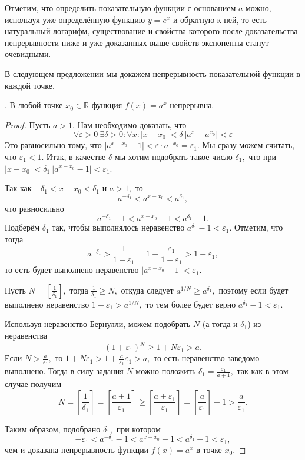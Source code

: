Отметим, что определить показательную
функции с основанием $a$ можно,
используя уже определённую функцию $y=e^x$
и обратную к ней, то есть натуральный
логарифм, существование и свойства
которого после доказательства непрерывности
ниже и уже доказанных выше свойств экспоненты
станут очевидными.

В следующем предложении мы докажем непрерывность
показательной функции в каждой точке.
\begin{proposition}.
    В любой точке
    $x_0 \in \mathbb R$ функция $f(x)=a^x$ непрерывна.
\end{proposition}
\begin{proof}
    Пусть $a > 1$. Нам необходимо доказать, что
    $$
        \forall \varepsilon>0 \ \exists \delta>0:
        \forall x: |x-x_0|<\delta \ |a ^x - a^{x_0}| <
        \varepsilon
    $$
    Это равносильно тому, что $|a^{x - x_0} - 1|
        < \varepsilon \cdot a^{-x_0} = \varepsilon_1$.
    Мы сразу можем считать, что $\varepsilon_1 < 1$.
    Итак, в качестве $\delta$ мы хотим подобрать
    такое число $\delta_1,$ что
    при $|x - x_0|< \delta_1 \ |a^{x - x_0}-1|<\varepsilon_1.$

    Так как $-\delta_1 < x - x_0 < \delta_1$
    и $a>1,$ то
    $$
        a^{-\delta_1} < a^{x - x_0} < a^{\delta_1},
    $$
    что равносильно
    $$
        a^{-\delta_1} - 1 < a^{x - x_0} - 1 < a^{\delta_1} - 1.
    $$
    Подберём $\delta_1$ так, чтобы
    выполнялось неравенство
    $a^{\delta_1} - 1 < \varepsilon_1.$
    Отметим, что тогда
    $$
        a^{-\delta_1}>
        \frac{1}{1+\varepsilon_1} = 1 - \frac{\varepsilon_1}
        {1 + \varepsilon_1} > 1 - \varepsilon_1,
    $$
    то есть будет выполнено неравенство
    $|a^{x - x_0}-1|<\varepsilon_1.$

    Пусть $N = \left[\frac{1}{\delta_1}\right],$
    тогда $\frac{1}{\delta_1} \geq N,$ откуда
    следует $a^{1/N} \geq a^{\delta_1},$
    поэтому если будет выполнено неравенство
    $1 + \varepsilon_1>a^{1/N},$ то
    тем более будет верно
    $a^{\delta_1} - 1 < \varepsilon_1.$

    Используя неравенство
    Бернулли, можем подобрать $N$ (а тогда и $\delta_1$)
    из неравенства
    $$
        (1 + \varepsilon_1)^N \geq 1 + N\varepsilon_1>a.
    $$
    Если $N>\frac{a}{\varepsilon_1},$ то
    $1 + N\varepsilon_1 > 1 +
        \frac{a}{\varepsilon_1}\varepsilon_1 > a,$
    то есть неравенство
    заведомо выполнено. Тогда
    в силу задания $N$ можно положить
    $\delta_1 =\frac{\varepsilon_1}{a+1},$
    так как в этом случае получим
    $$
        N = \left[\frac{1}{\delta_1}\right] = \left[\frac{a+1}{\varepsilon_1}\right]
        \geq \left[\frac{a + \varepsilon_1}{\varepsilon_1}\right] =
        \left[\frac{a}{\varepsilon_1}\right]+1 > \frac{a}{\varepsilon_1}.
    $$

    Таким образом, подобрано
    $\delta_1,$ при котором
    $$ -\varepsilon_1 < a^{-\delta_1} - 1
        < a^{x - x_0} - 1 < a^{\delta_1} - 1
        < \varepsilon_1,
    $$
    чем и доказана непрерывность функции
    $f(x)=a^x$ в точке $x_0.$
\end{proof}


